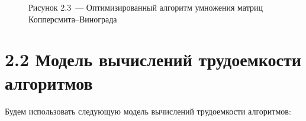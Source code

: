 \documentclass[12pt, a4paper]{report}
\begin{document}
\begin{figure}[H]
\caption*{Рисунок 2.3~--- Оптимизированный алгоритм умножения матриц Копперсмита--Винограда}
\end{figure}

\section*{2.2 Модель вычислений трудоемкости алгоритмов}

Будем использовать следующую модель вычислений трудоемкости алгоритмов:
\end{document}
